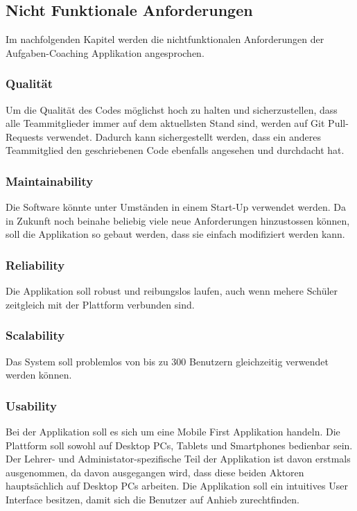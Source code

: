 \subsection{Nicht Funktionale Anforderungen}
Im nachfolgenden Kapitel werden die nichtfunktionalen Anforderungen der Aufgaben-Coaching Applikation angesprochen.

\subsubsection{Qualität}
Um die Qualität des Codes möglichst hoch zu halten und sicherzustellen, dass alle Teammitglieder immer auf dem aktuellsten Stand sind, werden auf Git Pull-Requests verwendet. Dadurch kann sichergestellt werden, dass ein anderes Teammitglied den geschriebenen Code ebenfalls angesehen und durchdacht hat.

\subsubsection*{Maintainability}
Die Software könnte unter Umständen in einem Start-Up verwendet werden. Da in Zukunft noch beinahe beliebig viele neue Anforderungen hinzustossen können, soll die Applikation so gebaut werden, dass sie einfach modifiziert werden kann. 

\subsubsection*{Reliability}
Die Applikation soll robust und reibungslos laufen, auch wenn mehere Schüler zeitgleich mit der Plattform verbunden sind.

\subsubsection*{Scalability}
Das System soll problemlos von bis zu 300 Benutzern gleichzeitig verwendet werden können. 

\subsubsection*{Usability}
Bei der Applikation soll es sich um eine Mobile First Applikation handeln. Die Plattform soll sowohl auf Desktop PCs, Tablets und Smartphones bedienbar sein. Der Lehrer- und Administator-spezifische Teil der Applikation ist davon erstmals ausgenommen, da davon ausgegangen wird, dass diese beiden Aktoren hauptsächlich auf Desktop PCs arbeiten. 
Die Applikation soll ein intuitives User Interface besitzen, damit sich die Benutzer auf Anhieb zurechtfinden. 

